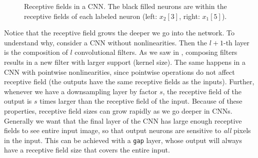 \begin{figure}[h!]
{\begin{minipage}{0.49\linewidth}
{
            }
        \end{minipage}
    }
    \caption{Receptive fields in a CNN. The black filled neurons are within the receptive fields of each labeled neuron (left: ${x_2[3]}$, right: ${x_1[5]}$).}
    \label{fig:convolutional_neural_networks:RFs}
\end{figure}

Notice that the receptive field grows the deeper we go into the network. To understand why, consider a CNN without nonlinearities. Then the $l+1$-th layer is the composition of $l$ convolutional filters. As we saw in \sect{\ref{sec:linear_image_filtering:properties_of_the_convolution}}, composing filters results in a new filter with larger support (kernel size). The same happens in a CNN with pointwise nonlinearities, since pointwise operations do not affect receptive field (the outputs have the same receptive fields as the inputs). Further, whenever we have a downsampling layer by factor $s$, the receptive field of the output is $s$ times larger than the receptive field of the input. Because of these properties, receptive field sizes can grow rapidly as we go deeper in CNNs. Generally we want that the final layer of the CNN has large enough receptive fields to see entire input image, so that output neurons are sensitive to \textit{all} pixels in the input. This can be achieved with a \texttt{gap} layer, whose output will always have a receptive field size that covers the entire input.

